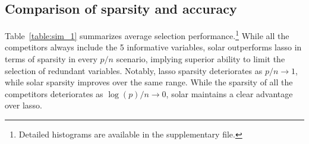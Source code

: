 \documentclass[11pt,review,authoryear]{elsarticle}
\begin{document}
\subsection{Comparison of sparsity and accuracy \label{subsection:suml1}}

Table~\ref{table:sim_1} summarizes average selection performance.\footnote{Detailed histograms are available in the supplementary file.} While all the competitors always include the 5 informative variables, solar outperforms lasso in terms of sparsity in every $p/n$ scenario, implying superior ability to limit the selection of redundant variables. Notably, lasso sparsity deteriorates as $p/n\rightarrow1$, while solar sparsity improves over the same range. While the sparsity of all the competitors deteriorates as $\log(p)/n\rightarrow0$, solar maintains a clear advantage over lasso.
\end{document}
